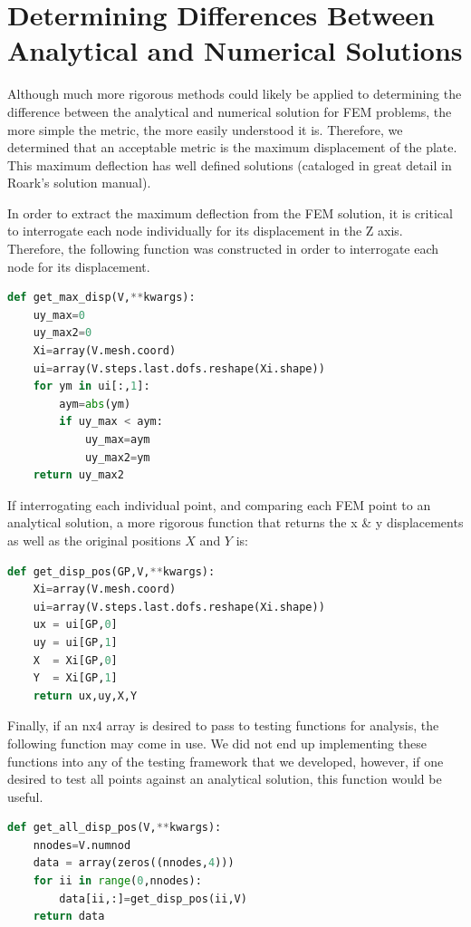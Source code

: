 \documentclass[10pt,letterpaper]{report}
\numberwithin{equation}{chapter}
\begin{document}
\section{Determining Differences Between Analytical and Numerical Solutions}
Although much more rigorous methods could likely be applied to determining the difference between the analytical and numerical solution for FEM problems, the more simple the metric, the more easily understood it is. Therefore, we determined that an acceptable metric is the maximum displacement of the plate. This maximum deflection has well defined solutions (cataloged in great detail in Roark's solution manual). 

In order to extract the maximum deflection from the FEM solution, it is critical to interrogate each node individually for its displacement in the Z axis. Therefore, the following function was constructed in order to interrogate each node for its displacement.
\begin{lstlisting}[language=Python]
def get_max_disp(V,**kwargs):
    uy_max=0
    uy_max2=0
    Xi=array(V.mesh.coord)
    ui=array(V.steps.last.dofs.reshape(Xi.shape))
    for ym in ui[:,1]:
        aym=abs(ym)
        if uy_max < aym:
            uy_max=aym
            uy_max2=ym
    return uy_max2
\end{lstlisting}

If interrogating each individual point, and comparing each FEM point to an analytical solution, a more rigorous function that returns the x \& y displacements as well as the original positions $X$ and $Y$ is:
\begin{lstlisting}[language=Python]
def get_disp_pos(GP,V,**kwargs):
    Xi=array(V.mesh.coord)
    ui=array(V.steps.last.dofs.reshape(Xi.shape))
    ux = ui[GP,0]
    uy = ui[GP,1]
    X  = Xi[GP,0]
    Y  = Xi[GP,1]
    return ux,uy,X,Y
\end{lstlisting}

Finally, if an nx4 array is desired to pass to testing functions for analysis, the following function may come in use. We did not end up implementing these functions into any of the testing framework that we developed, however, if one desired to test all points against an analytical solution, this function would be useful.
\begin{lstlisting}[language=Python]
def get_all_disp_pos(V,**kwargs):
    nnodes=V.numnod
    data = array(zeros((nnodes,4)))
    for ii in range(0,nnodes):
        data[ii,:]=get_disp_pos(ii,V)
    return data
\end{lstlisting}
\end{document}
